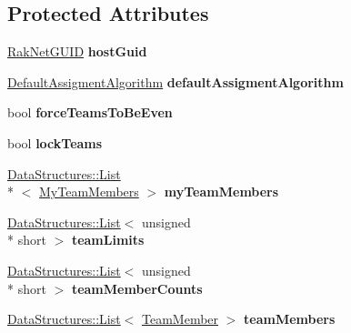 \subsection*{Protected Attributes}
\begin{DoxyCompactItemize}
\item 
\hypertarget{class_rak_net_1_1_team_balancer_ae3a23cbaa1e5a807ad39db57e28348c1}{\hyperlink{struct_rak_net_1_1_rak_net_g_u_i_d}{Rak\-Net\-G\-U\-I\-D} {\bfseries host\-Guid}}\label{class_rak_net_1_1_team_balancer_ae3a23cbaa1e5a807ad39db57e28348c1}

\item 
\hypertarget{class_rak_net_1_1_team_balancer_a1af87d106995d45248b8eaf6d9703188}{\hyperlink{class_rak_net_1_1_team_balancer_a615ce461958441f9a0a559ba14610172}{Default\-Assigment\-Algorithm} {\bfseries default\-Assigment\-Algorithm}}\label{class_rak_net_1_1_team_balancer_a1af87d106995d45248b8eaf6d9703188}

\item 
\hypertarget{class_rak_net_1_1_team_balancer_a58dfc8e116c8718f2880b3df733ec271}{bool {\bfseries force\-Teams\-To\-Be\-Even}}\label{class_rak_net_1_1_team_balancer_a58dfc8e116c8718f2880b3df733ec271}

\item 
\hypertarget{class_rak_net_1_1_team_balancer_a7811420be8b93c668ad5e4189bf104b2}{bool {\bfseries lock\-Teams}}\label{class_rak_net_1_1_team_balancer_a7811420be8b93c668ad5e4189bf104b2}

\item 
\hypertarget{class_rak_net_1_1_team_balancer_a6ec192ab45933927f786b91b7b441b1e}{\hyperlink{class_data_structures_1_1_list}{Data\-Structures\-::\-List}\\*
$<$ \hyperlink{struct_rak_net_1_1_team_balancer_1_1_my_team_members}{My\-Team\-Members} $>$ {\bfseries my\-Team\-Members}}\label{class_rak_net_1_1_team_balancer_a6ec192ab45933927f786b91b7b441b1e}

\item 
\hypertarget{class_rak_net_1_1_team_balancer_ac4c371292014dc79537f27d5e8fa022c}{\hyperlink{class_data_structures_1_1_list}{Data\-Structures\-::\-List}$<$ unsigned \\*
short $>$ {\bfseries team\-Limits}}\label{class_rak_net_1_1_team_balancer_ac4c371292014dc79537f27d5e8fa022c}

\item 
\hypertarget{class_rak_net_1_1_team_balancer_ab8212a520dadf5862a91ec867dbd3865}{\hyperlink{class_data_structures_1_1_list}{Data\-Structures\-::\-List}$<$ unsigned \\*
short $>$ {\bfseries team\-Member\-Counts}}\label{class_rak_net_1_1_team_balancer_ab8212a520dadf5862a91ec867dbd3865}

\item 
\hypertarget{class_rak_net_1_1_team_balancer_aab15eab348749d16114b2a9bc8ad436c}{\hyperlink{class_data_structures_1_1_list}{Data\-Structures\-::\-List}$<$ \hyperlink{struct_rak_net_1_1_team_balancer_1_1_team_member}{Team\-Member} $>$ {\bfseries team\-Members}}\label{class_rak_net_1_1_team_balancer_aab15eab348749d16114b2a9bc8ad436c}

\end{DoxyCompactItemize}


